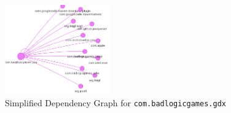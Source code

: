 \begin{figure}
  \centering
    \includegraphics[width=0.40\textwidth]{media/network-sample.png}
    \caption{Simplified Dependency Graph for \texttt{com.badlogicgames.gdx}\label{fig:network-sample}}
\end{figure}